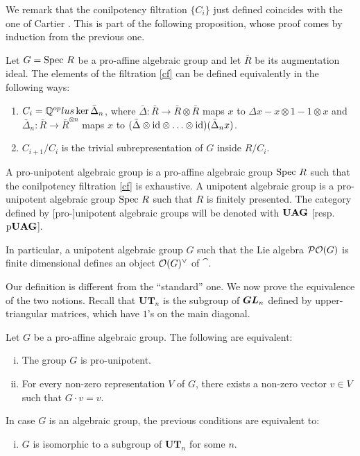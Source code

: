 We remark that the conilpotency filtration $\{C_i\}$ just defined coincides with the one of Cartier \cite[3.8 (A)]{cartier-ha}. This is part of the following proposition, whose proof comes by induction from the previous one.
\begin{prop}
Let $G=\mathrm{Spec}~ R$ be a pro-affine algebraic group and let $\bar{R}$ be its augmentation ideal.
The elements of the filtration \eqref{cf} can be defined equivalently in the following ways:
\begin{enumerate}
	\item $C_i=\mathbb{Q}^{op}lus\ker\bar{\Delta}_n$, where $\bar{\Delta}: \bar{R}\to \bar{R}\otimes \bar{R}$ maps  $x$ to $\Delta x-x\otimes1-1\otimes x$ and $\bar{\Delta}_n: \bar{R}\to \bar{R}^{\otimes n}$ maps $x$ to $(\bar{\Delta}\otimes\mathrm{id}\otimes\ldots\otimes\mathrm{id})(\bar{\Delta}_nx)$.
	\item $C_{i+1}/C_i$ is the trivial subrepresentation of $G$ inside $R/C_i$.
\end{enumerate}
\end{prop}

\begin{defn}
A pro-unipotent algebraic group is a pro-affine algebraic group $\mathrm{Spec}~ R$ such that the conilpotency filtration \eqref{cf} is exhaustive.
A unipotent algebraic group is a pro-unipotent algebraic group $\mathrm{Spec}~ R$ such that $R$ is finitely presented. The category defined by [pro-]unipotent algebraic groups will be denoted with $\operatorname{\bf{UAG}}$ [resp. $\operatorname{p\bf{UAG}}$].
\end{defn} 

In particular, a unipotent algebraic group $G$ such that the Lie algebra $\mathcal{P}\mathcal{O}(G)$ is finite dimensional defines an object $\mathcal{O}(G)^\vee$ of $\cat$.

Our definition is different from the ``standard'' one. We now prove the equivalence of the two notions. Recall that $\mathbf{UT}_n$ is the subgroup of $\boldsymbol{GL}_n$ defined by upper-triangular matrices, which have $1$'s on the main diagonal. 

\begin{prop}
Let $G$ be a pro-affine algebraic group. The following are equivalent:
\begin{enumerate}[(i)]
    \item The group $G$ is pro-unipotent.
    \item For every non-zero representation $V$ of $G$, there exists a non-zero vector $v\in V$ such that $G\cdot v=v$.
\end{enumerate}
In case $G$ is an algebraic group, the previous conditions are equivalent to:
\begin{enumerate}[(iii)]
    \item $G$ is isomorphic to a subgroup of $\mathbf{UT}_n$ for some $n$.
\end{enumerate}
\end{prop}

